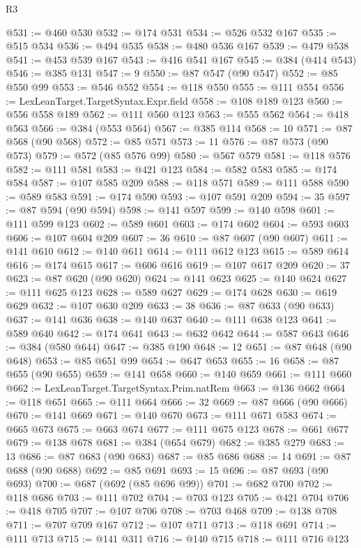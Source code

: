\begin{lexlean}{R3}
\begin{coremodule}
@531 := @460 @530
@532 := @174 @531
@534 := @526 @532 @167
@535 := @515 @534
@536 := @494 @535
@538 := @480 @536 @167
@539 := @479 @538
@541 := @453 @539 @167
@543 := @416 @541 @167
@545 := @384 (@414 @543)
@546 := @385 @131
@547 := 9
@550 := @87 @547 (@90 @547)
@552 := @85 @550 @99
@553 := @546 @552
@554 := @118 @550
@555 := @111 @554
@556 := LexLeanTarget.TargetSyntax.Expr.field
@558 := @108 @189 @123
@560 := @556 @558 @189
@562 := @111 @560 @123
@563 := @555 @562
@564 := @418 @563
@566 := @384 (@553 @564)
@567 := @385 @114
@568 := 10
@571 := @87 @568 (@90 @568)
@572 := @85 @571
@573 := 11
@576 := @87 @573 (@90 @573)
@579 := @572 (@85 @576 @99)
@580 := @567 @579
@581 := @118 @576
@582 := @111 @581
@583 := @421 @123
@584 := @582 @583
@585 := @174 @584
@587 := @107 @585 @209
@588 := @118 @571
@589 := @111 @588
@590 := @589 @583
@591 := @174 @590
@593 := @107 @591 @209
@594 := 35
@597 := @87 @594 (@90 @594)
@598 := @141 @597
@599 := @140 @598
@601 := @111 @599 @123
@602 := @589 @601
@603 := @174 @602
@604 := @593 @603
@606 := @107 @604 @209
@607 := 36
@610 := @87 @607 (@90 @607)
@611 := @141 @610
@612 := @140 @611
@614 := @111 @612 @123
@615 := @589 @614
@616 := @174 @615
@617 := @606 @616
@619 := @107 @617 @209
@620 := 37
@623 := @87 @620 (@90 @620)
@624 := @141 @623
@625 := @140 @624
@627 := @111 @625 @123
@628 := @589 @627
@629 := @174 @628
@630 := @619 @629
@632 := @107 @630 @209
@633 := 38
@636 := @87 @633 (@90 @633)
@637 := @141 @636
@638 := @140 @637
@640 := @111 @638 @123
@641 := @589 @640
@642 := @174 @641
@643 := @632 @642
@644 := @587 @643
@646 := @384 (@580 @644)
@647 := @385 @190
@648 := 12
@651 := @87 @648 (@90 @648)
@653 := @85 @651 @99
@654 := @647 @653
@655 := 16
@658 := @87 @655 (@90 @655)
@659 := @141 @658
@660 := @140 @659
@661 := @111 @660
@662 := LexLeanTarget.TargetSyntax.Prim.natRem
@663 := @136 @662
@664 := @118 @651
@665 := @111 @664
@666 := 32
@669 := @87 @666 (@90 @666)
@670 := @141 @669
@671 := @140 @670
@673 := @111 @671 @583
@674 := @665 @673
@675 := @663 @674
@677 := @111 @675 @123
@678 := @661 @677
@679 := @138 @678
@681 := @384 (@654 @679)
@682 := @385 @279
@683 := 13
@686 := @87 @683 (@90 @683)
@687 := @85 @686
@688 := 14
@691 := @87 @688 (@90 @688)
@692 := @85 @691
@693 := 15
@696 := @87 @693 (@90 @693)
@700 := @687 (@692 (@85 @696 @99))
@701 := @682 @700
@702 := @118 @686
@703 := @111 @702
@704 := @703 @123
@705 := @421 @704
@706 := @418 @705
@707 := @107 @706
@708 := @703 @468
@709 := @138 @708
@711 := @707 @709 @167
@712 := @107 @711
@713 := @118 @691
@714 := @111 @713
@715 := @141 @311
@716 := @140 @715
@718 := @111 @716 @123

\end{coremodule}
\end{lexlean}

